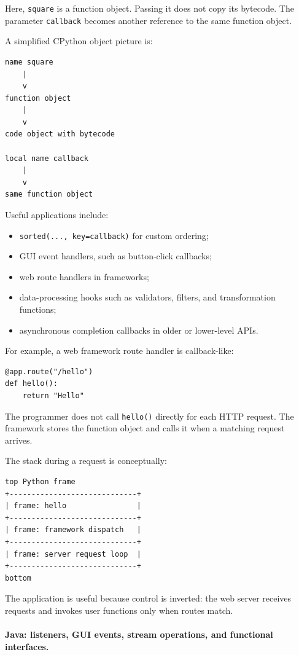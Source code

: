 Here, \texttt{square} is a function object. Passing it does not copy its bytecode. The parameter \texttt{callback} becomes another reference to the same function object.

A simplified CPython object picture is:

\begin{verbatim}
name square
    |
    v
function object
    |
    v
code object with bytecode

local name callback
    |
    v
same function object
\end{verbatim}

Useful applications include:

\begin{itemize}
    \item \texttt{sorted(..., key=callback)} for custom ordering;
    \item GUI event handlers, such as button-click callbacks;
    \item web route handlers in frameworks;
    \item data-processing hooks such as validators, filters, and transformation functions;
    \item asynchronous completion callbacks in older or lower-level APIs.
\end{itemize}

For example, a web framework route handler is callback-like:

\begin{verbatim}
@app.route("/hello")
def hello():
    return "Hello"
\end{verbatim}

The programmer does not call \texttt{hello()} directly for each HTTP request. The framework stores the function object and calls it when a matching request arrives.

The stack during a request is conceptually:

\begin{verbatim}
top Python frame
+-----------------------------+
| frame: hello                |
+-----------------------------+
| frame: framework dispatch   |
+-----------------------------+
| frame: server request loop  |
+-----------------------------+
bottom
\end{verbatim}

The application is useful because control is inverted: the web server receives requests and invokes user functions only when routes match.

\paragraph{Java: listeners, GUI events, stream operations, and functional interfaces.}

